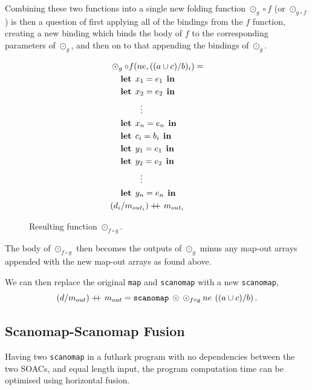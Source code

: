 \documentclass[11pt]{article}
\newcommand\doubleplus{+\kern-1.3ex+\kern0.8ex}
\newcommand\lett{\phantom{-}\:\:\mathbf{let}\:\:}
\newcommand\inn{\:\:\mathbf{in}\:\:}
\begin{document}
Combining these two functions into a single new folding function $\odot_g \circ f$ (or $\odot_{g \circ f}$) is then a question of first applying all of the bindings
 from the $f$ function, creating a new binding which binds the body of $f$ to the corresponding parameters of $\odot_g$, and then on
 to that appending the bindings of $\odot_g$.


\begin{figure}[h!]\centering
  \begin{mdframed}[style=alignbox]
    \begin{align*}
      &\odot_{g} \circ f(ne, ((a \cup c) / b)_i) = \\
      &\lett x_1 = e_1 \inn\\
      &\lett x_2 = e_2 \inn\\
      &\phantom{----}\vdots\\
      &\lett x_n = e_n \inn\\
      &\lett c_i = b_i \inn\\
      &\lett y_1 = e_1 \inn\\
      &\lett y_2 = e_2 \inn\\
      &\phantom{----}\vdots\\
      &\lett y_n = e_n \inn\\
      &(d_i /m_{out_i}) \doubleplus m_{out_i}
    \end{align*}
  \end{mdframed}

  \caption{Resulting function $\odot_{f \circ g}$.}
  \label{fig:fusresfun}
\end{figure}
The body of $\odot_{f\circ g}$ then becomes the outputs of $\odot_g$ minus any map-out arrays appended with the new map-out arrays as
 found above.

We can then replace the original \texttt{map} and \texttt{scanomap} with a new \texttt{scanomap},
$$(d / m_{out}) \doubleplus m_{out} = \mathtt{scanomap} \: \odot \: \odot_{f \circ g} \: ne \: \left((a \cup c) / b \right)\mathnormal{.} $$

\subsection{Scanomap-Scanomap Fusion}
Having two \texttt{scanomap} in a futhark program with no dependencies between the two SOACs, and equal length input, the program computation time can be optimised using horizontal fusion. 
\end{document}

